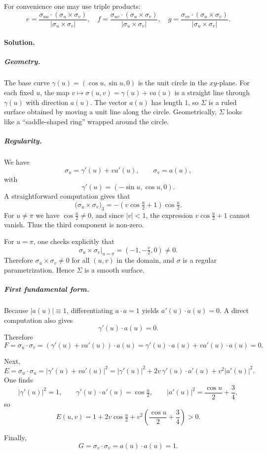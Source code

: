 \documentclass[12pt,a4paper]{article}
\theoremstyle{plain}
\theoremstyle{definition}      %
\begin{document}
For convenience one may use triple products:
\[
e = \frac{\sigma_{uu}\cdot(\sigma_u\times\sigma_v)}{|\sigma_u\times\sigma_v|},\quad
f = \frac{\sigma_{uv}\cdot(\sigma_u\times\sigma_v)}{|\sigma_u\times\sigma_v|},\quad
g = \frac{\sigma_{vv}\cdot(\sigma_u\times\sigma_v)}{|\sigma_u\times\sigma_v|}.
\]

\paragraph{Solution.}

\subparagraph{Geometry.}
The base curve $\gamma(u)=(\cos u,\sin u,0)$ is the unit circle in the $xy$-plane.
For each fixed $u$, the map $v\mapsto \sigma(u,v)=\gamma(u)+v a(u)$ is a straight
line through $\gamma(u)$ with direction $a(u)$.
The vector $a(u)$ has length $1$, so $\Sigma$ is a ruled surface obtained by
moving a unit line along the circle.  Geometrically, $\Sigma$ looks like a
“saddle-shaped ring” wrapped around the circle.

\subparagraph{Regularity.}
We have
\[
\sigma_u=\gamma'(u)+v a'(u),\qquad
\sigma_v=a(u),
\]
with
\[
\gamma'(u)=(-\sin u,\cos u,0).
\]
A straightforward computation gives that
\[
\bigl(\sigma_u\times\sigma_v\bigr)_3
=-(v\cos\tfrac u2+1)\cos\tfrac u2.
\]
For $u\neq \pi$ we have $\cos\tfrac u2\neq 0$, and since $|v|<1$,
the expression $v\cos\tfrac u2 + 1$ cannot vanish.  Thus the third
component is non-zero.

For $u=\pi$, one checks explicitly that
\[
\sigma_u\times\sigma_v\big|_{u=\pi}=(-1,-\tfrac v2,0)\neq 0.
\]
Therefore $\sigma_u\times\sigma_v\neq 0$ for all $(u,v)$ in the domain,
and $\sigma$ is a regular parametrization. Hence $\Sigma$ is a smooth surface.

\subparagraph{First fundamental form.}
Because $|a(u)|\equiv 1$, differentiating $a\cdot a=1$ yields
$a'(u)\cdot a(u)=0$.
A direct computation also gives
\[
\gamma'(u)\cdot a(u)=0.
\]
Therefore
\[
F = \sigma_u\cdot\sigma_v
= (\gamma'(u)+v a'(u))\cdot a(u)
= \gamma'(u)\cdot a(u) + v a'(u)\cdot a(u) = 0.
\]

Next,
\[
E = \sigma_u\cdot\sigma_u
= |\gamma'(u)+v a'(u)|^2
= |\gamma'(u)|^2 + 2v\,\gamma'(u)\cdot a'(u) + v^2|a'(u)|^2.
\]
One finds
\[
|\gamma'(u)|^2 = 1,\qquad
\gamma'(u)\cdot a'(u) = \cos\tfrac u2,\qquad
|a'(u)|^2 = \frac{\cos u}{2} + \frac34,
\]
so
\[
E(u,v) = 1 + 2v\cos\tfrac u2
+ v^2\left(\frac{\cos u}{2}+\frac34\right) > 0.
\]

Finally,
\[
G = \sigma_v\cdot\sigma_v = a(u)\cdot a(u) = 1.
\]
\end{document}
